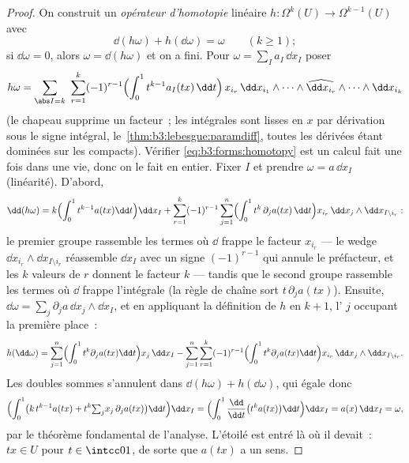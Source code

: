 \begin{proof}
On construit un \emph{opérateur d'homotopie} linéaire
$h\colon \Omega^k(U) \to \Omega^{k-1}(U)$ avec
\begin{equation}\label{eq:b3:forms:homotopy}
\dd(h\omega) + h(\dd\omega) = \omega
\qquad (k \geq 1);
\end{equation}
si $\dd\omega = 0$, alors $\omega = \dd(h\omega)$ et on a
fini. Pour $\omega = \sum_I a_I\,\dd x_I$ poser
\[
h\omega = \sum_{\abs I = k}\ \sum_{r=1}^{k}(-1)^{r-1}
\Bigl(\int_0^1 t^{k-1}a_I(tx)\,\dd t\Bigr)\,
x_{i_r}\,\dd x_{i_1}\wedge\dots\wedge
\widehat{\dd x_{i_r}}\wedge\dots\wedge\dd x_{i_k}
\]
(le chapeau supprime un facteur~; les intégrales sont lisses
en $x$ par dérivation sous le signe intégral,
le~\cref{thm:b3:lebesgue:paramdiff}, toutes les dérivées étant
dominées sur les compacts). Vérifier
\eqref{eq:b3:forms:homotopy} est un calcul fait une fois
dans une vie, donc on le fait en entier. Fixer $I$ et prendre
$\omega = a\,\dd x_I$ (linéarité). D'abord,
\[
\dd(h\omega) = k\Bigl(\int_0^1t^{k-1}a(tx)\dd t\Bigr)\dd x_I
+ \sum_{r=1}^k(-1)^{r-1}\sum_{j=1}^n
\Bigl(\int_0^1t^{k}\,\partial_ja(tx)\,\dd t\Bigr)
x_{i_r}\,\dd x_j\wedge\dd x_{I\setminus i_r} :
\]
le premier groupe rassemble les termes où $\dd$ frappe le
facteur $x_{i_r}$ --- le wedge $\dd x_{i_r}\wedge\dd
x_{I\setminus i_r}$ réassemble $\dd x_I$ avec un signe
$(-1)^{r-1}$ qui annule le préfacteur, et les $k$ valeurs de
$r$ donnent le facteur $k$ --- tandis que le second groupe
rassemble les termes où $\dd$ frappe l'intégrale (la règle
de chaîne sort $t\,\partial_ja(tx)$). Ensuite, $\dd\omega =
\sum_j\partial_ja\,\dd x_j\wedge\dd x_I$, et en appliquant
la définition de $h$ en  $k+1$, l' $j$ occupant
la première place~:
\[
h(\dd\omega) = \sum_{j=1}^n\Bigl(\int_0^1t^{k}
\partial_ja(tx)\dd t\Bigr)x_j\,\dd x_I
- \sum_{j=1}^n\sum_{r=1}^k(-1)^{r-1}
\Bigl(\int_0^1t^{k}\partial_ja(tx)\dd t\Bigr)
x_{i_r}\,\dd x_j\wedge\dd x_{I\setminus i_r} .
\]
Les doubles sommes s'annulent dans $\dd(h\omega) +
h(\dd\omega)$, qui égale donc
\[
\Bigl(\int_0^1\bigl(k\,t^{k-1}a(tx) +
t^k{\textstyle\sum_j}x_j\,\partial_ja(tx)\bigr)\dd t\Bigr)
\dd x_I
= \Bigl(\int_0^1\frac{\dd}{\dd t}\bigl(t^ka(tx)\bigr)\dd
t\Bigr)\dd x_I
= a(x)\,\dd x_I = \omega,
\]
par le théorème fondamental de l'analyse. L'étoilé est entré
là où il devait~: $tx \in U$ pour $t \in \intcc01$, de sorte
que $a(tx)$ a un sens.
\end{proof}

